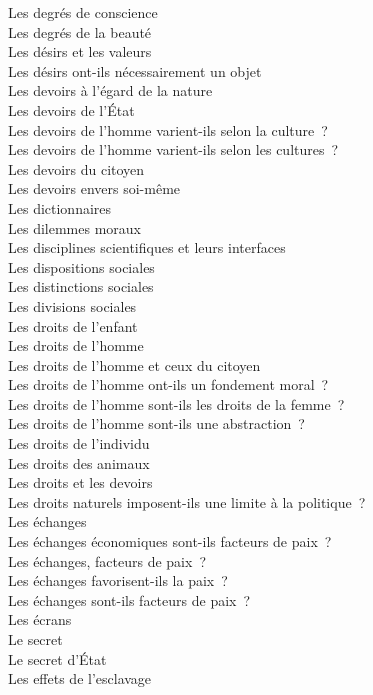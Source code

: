 \documentclass[a4paper,12pt]{article}
\begin{document}
Les degrés de conscience \\
Les degrés de la beauté \\
Les désirs et les valeurs \\
Les désirs ont-ils nécessairement un objet \\
Les devoirs à l'égard de la nature \\
Les devoirs de l'État \\
Les devoirs de l'homme varient-ils selon la culture ? \\
Les devoirs de l'homme varient-ils selon les cultures ? \\
Les devoirs du citoyen \\
Les devoirs envers soi-même \\
Les dictionnaires \\
Les dilemmes moraux \\
Les disciplines scientifiques et leurs interfaces \\
Les dispositions sociales \\
Les distinctions sociales \\
Les divisions sociales \\
Les droits de l'enfant \\
Les droits de l'homme \\
Les droits de l'homme et ceux du citoyen \\
Les droits de l'homme ont-ils un fondement moral ? \\
Les droits de l'homme sont-ils les droits de la femme ? \\
Les droits de l'homme sont-ils une abstraction ? \\
Les droits de l'individu \\
Les droits des animaux \\
Les droits et les devoirs \\
Les droits naturels imposent-ils une limite à la politique ? \\
Les échanges \\
Les échanges économiques sont-ils facteurs de paix ? \\
Les échanges, facteurs de paix ? \\
Les échanges favorisent-ils la paix ? \\
Les échanges sont-ils facteurs de paix ? \\
Les écrans \\
Le secret \\
Le secret d'État \\
Les effets de l'esclavage \\
\end{document}
